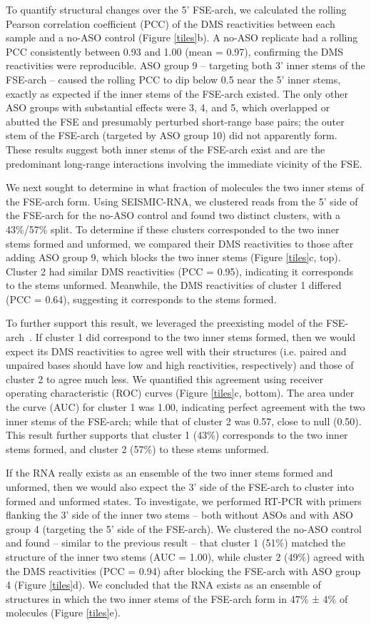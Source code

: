 \documentclass[main.tex]{subfiles}
\begin{document}
To quantify structural changes over the 5' FSE-arch, we calculated the rolling Pearson correlation coefficient (PCC) of the DMS reactivities between each sample and a no-ASO control (Figure \ref{tiles}b).
A no-ASO replicate had a rolling PCC consistently between 0.93 and 1.00 (mean = 0.97), confirming the DMS reactivities were reproducible.
ASO group 9 -- targeting both 3' inner stems of the FSE-arch -- caused the rolling PCC to dip below 0.5 near the 5' inner stems, exactly as expected if the inner stems of the FSE-arch existed.
The only other ASO groups with substantial effects were 3, 4, and 5, which overlapped or abutted the FSE and presumably perturbed short-range base pairs; the outer stem of the FSE-arch (targeted by ASO group 10) did not apparently form.
These results suggest both inner stems of the FSE-arch exist and are the predominant long-range interactions involving the immediate vicinity of the FSE.

We next sought to determine in what fraction of molecules the two inner stems of the FSE-arch form.
Using SEISMIC-RNA, we clustered reads from the 5' side of the FSE-arch for the no-ASO control and found two distinct clusters, with a 43\%/57\% split.
To determine if these clusters corresponded to the two inner stems formed and unformed, we compared their DMS reactivities to those after adding ASO group 9, which blocks the two inner stems (Figure \ref{tiles}c, top).
Cluster 2 had similar DMS reactivities (PCC = 0.95), indicating it corresponds to the stems unformed.
Meanwhile, the DMS reactivities of cluster 1 differed (PCC = 0.64), suggesting it corresponds to the stems formed.

To further support this result, we leveraged the preexisting model of the FSE-arch~\cite{Ziv2020}.
If cluster 1 did correspond to the two inner stems formed, then we would expect its DMS reactivities to agree well with their structures (i.e. paired and unpaired bases should have low and high reactivities, respectively) and those of cluster 2 to agree much less.
We quantified this agreement using receiver operating characteristic (ROC) curves (Figure \ref{tiles}c, bottom).
The area under the curve (AUC) for cluster 1 was 1.00, indicating perfect agreement with the two inner stems of the FSE-arch; while that of cluster 2 was 0.57, close to null (0.50).
This result further supports that cluster 1 (43\%) corresponds to the two inner stems formed, and cluster 2 (57\%) to these stems unformed.

If the RNA really exists as an ensemble of the two inner stems formed and unformed, then we would also expect the 3' side of the FSE-arch to cluster into formed and unformed states.
To investigate, we performed RT-PCR with primers flanking the 3' side of the inner two stems -- both without ASOs and with ASO group 4 (targeting the 5' side of the FSE-arch).
We clustered the no-ASO control and found -- similar to the previous result -- that cluster 1 (51\%) matched the structure of the inner two stems (AUC = 1.00), while cluster 2 (49\%) agreed with the DMS reactivities (PCC = 0.94) after blocking the FSE-arch with ASO group 4 (Figure \ref{tiles}d).
We concluded that the RNA exists as an ensemble of structures in which the two inner stems of the FSE-arch form in 47\% ± 4\% of molecules (Figure \ref{tiles}e).
\end{document}
